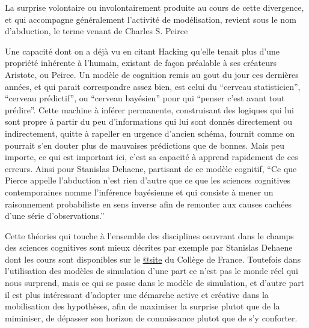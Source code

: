 La surprise volontaire ou involontairement produite au cours de cette divergence, et qui accompagne généralement l'activité de modélisation, revient sous le nom d'abduction, le terme venant de Charles S. Peirce \autocites{Besse2000, Banos2013, Phan2006, Livet2014} 

Une capacité dont on a déjà vu en citant Hacking \autocites{Hacking1989,Hacking2003, Hacking2006} qu'elle tenait plus d'une propriété inhérente à l'humain, existant de façon préalable à ses créateurs Aristote, ou Peirce. Un modèle de cognition remis au gout du jour ces dernières années, et qui parait correspondre assez bien, est celui du \enquote{cerveau statisticien},  \enquote{cerveau prédictif}, ou \enquote{cerveau bayésien} pour qui \enquote{penser c'est avant tout prédire}. Cette machine à inférer permanente, construisant des logiques qui lui sont propre à partir du peu d'informations qui lui sont donnés directement ou indirectement, quitte à rapeller en urgence d'ancien schéma, fournit comme on pourrait s'en douter plus de mauvaises prédictions que de bonnes. Mais peu importe, ce qui est important ici, c'est sa capacité à apprend rapidement de ces erreurs. 
Ainsi pour Stanislas Dehaene, partisant de ce modèle cognitif, \enquote{Ce que Pierce appelle l'abduction n'est rien d'autre que ce que les sciences cognitives contemporaines nomme l'inférence bayésienne et qui consiste à mener un raisonnement probabiliste en sens inverse afin de remonter aux causes cachées d'une série d'observations.}

Cette théories qui touche à l'ensemble des disciplines oeuvrant dans le champs des sciences cognitives sont mieux décrites par exemple par Stanislas Dehaene dont les cours sont disponibles sur le \href{http://www.college-de-france.fr/site/stanislas-dehaene}{@site} du Collège de France. Toutefois dans l'utilisation des modèles de simulation d'une part ce n'est pas le monde réel qui nous surprend, mais ce qui se passe dans le modèle de simulation, et d'autre part il est plus intéressant d'adopter une démarche active et créative dans la mobilisation des hypothèses, afin de maximiser la surprise plutot que de la miminiser, de dépasser son horizon de connaissance plutot que de s'y conforter. 


